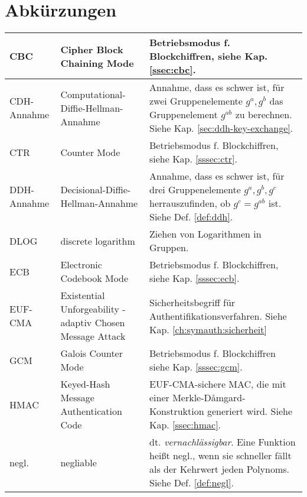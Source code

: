 \section{Abkürzungen}
\begin{tabular}{p{} | p{} | p{}}
  CBC         & Cipher Block Chaining Mode                                 & Betriebsmodus f. Blockchiffren, siehe Kap. \ref{ssec:cbc}.       \\ \hline
  CDH-Annahme & Computational-Diffie-Hellman-Annahme                       & Annahme, dass es schwer ist, für zwei Gruppenelemente $g^a, g^b$                                
                                              das Gruppenelement $g^{ab}$ zu berechnen. Siehe Kap. \ref{sec:ddh-key-exchange}. \\ \hline
  CTR         & Counter Mode                                               & Betriebsmodus f. Blockchiffren, siehe Kap. \ref{sssec:ctr}.       \\ \hline
  DDH-Annahme & Decisional-Diffie-Hellman-Annahme                          & Annahme, dass es schwer ist, für drei Gruppenelemente                                           
                                  $g^a, g^b, g^c$ herrauszufinden, ob $g^c= g^{ab}$ ist. Siehe Def. \ref{def:ddh}. \\ \hline
  DLOG        & discrete logarithm                                         & Ziehen von Logarithmen in Gruppen.                               \\ \hline
  ECB         & Electronic Codebook Mode                                   & Betriebsmodus f. Blockchiffren, siehe Kap. \ref{sssec:ecb}.       \\ \hline
  EUF-CMA     & Existential Unforgeability - adaptiv Chosen Message Attack & Sicherheitsbegriff für Authentifikationsverfahren. Siehe Kap.                                   
                                           \ref{ch:symauth:sicherheit}                                      \\ \hline
  GCM         & Galois Counter Mode                                        & Betriebsmodus f. Blockchiffren  siehe Kap. \ref{sssec:gcm}.       \\ \hline
  HMAC        & Keyed-Hash Message Authentication Code                     & EUF-CMA-sichere MAC, die mit einer Merkle-Dåmgard-Konstruktion generiert wird.                  
                                                            Siehe Kap. \ref{ssec:hmac}.                                      \\ \hline
  negl.       & negliable                                                  & dt. \textit{vernachlässigbar}. Eine Funktion heißt negl., 
                                                                             wenn sie schneller fällt als der Kehrwert jeden Polynoms. Siehe Def. \ref{def:negl}.\\ \hline


\end{tabular}
